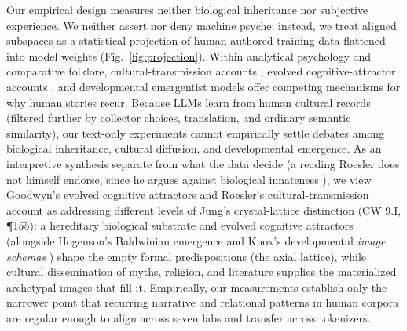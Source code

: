 \documentclass[conference]{IEEEtran}
\begin{document}
Our empirical design measures neither biological inheritance nor subjective experience. We neither assert nor deny machine psyche; instead, we treat aligned subspaces as a statistical projection of human-authored training data flattened into model weights (Fig.~\ref{fig:projection}). Within analytical psychology and comparative folklore, cultural-transmission accounts \cite{roesler2012archetypes,dasilva2016comparative,thuillard2018large,huggins2021jung}, evolved cognitive-attractor accounts \cite{goodwyn2010approaching,goodwyn2013recurrent}, and developmental emergentist models \cite{hogenson2001baldwin,knox2003archetype} offer competing mechanisms for why human stories recur. Because LLMs learn from human cultural records (filtered further by collector choices, translation, and ordinary semantic similarity), our text-only experiments cannot empirically settle debates among biological inheritance, cultural diffusion, and developmental emergence. As an interpretive synthesis separate from what the data decide (a reading Roesler does not himself endorse, since he argues against biological innateness \cite{roesler2012archetypes}), we view Goodwyn's evolved cognitive attractors \cite{goodwyn2010approaching,goodwyn2013recurrent} and Roesler's cultural-transmission account \cite{roesler2012archetypes} as addressing different levels of Jung's crystal-lattice distinction \cite{jung1968archetypes} (CW 9.I, \P155): a hereditary biological substrate and evolved cognitive attractors (alongside Hogenson's Baldwinian emergence and Knox's developmental \textit{image schemas} \cite{hogenson2001baldwin,knox2003archetype}) shape the empty formal predispositions (the axial lattice), while cultural dissemination of myths, religion, and literature supplies the materialized archetypal images that fill it. Empirically, our measurements establish only the narrower point that recurring narrative and relational patterns in human corpora are regular enough to align across seven labs and transfer across tokenizers.
\end{document}
